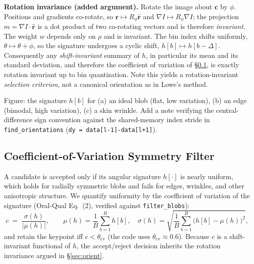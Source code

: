 \begin{enrichbox}
\textbf{Rotation invariance (added argument).} Rotate the image about
$\mathbf{c}$ by $\phi$. Positions and gradients co-rotate, so $\hat{\mathbf{r}}
\mapsto R_\phi\hat{\mathbf{r}}$ and $\nabla I\mapsto R_\phi\nabla I$; the
projection $m=\nabla I\cdot\hat{\mathbf{r}}$ is a dot product of two co-rotating
vectors and is therefore \emph{invariant}. The weight $w$ depends only on
$\rho$ and is invariant. The bin index shifts uniformly, $\theta\mapsto
\theta+\phi$, so the signature undergoes a cyclic shift, $h[b]\mapsto
h[b-\Delta]$. Consequently any \emph{shift-invariant} summary of $h$, in
particular its mean and its standard deviation, and therefore the coefficient of variation
of \S\ref{sec:cov}, is exactly rotation invariant up to bin quantization.
Note this yields a rotation-invariant \emph{selection criterion}, not a
canonical orientation as in Lowe's method.
\end{enrichbox}

\begin{fillbox}
Figure: the signature $h[b]$ for (a) an ideal blob (flat, low variation),
(b) an edge (bimodal, high variation), (c) a skin wrinkle. Add a note verifying
the central-difference sign convention against the shared-memory index stride
in \texttt{find\_orientations} (\texttt{dy = data[l-1]-data[l+1]}).
\end{fillbox}

\subsection{Coefficient-of-Variation Symmetry Filter}
\label{sec:cov}

A candidate is accepted only if its angular signature $h[\cdot]$ is nearly
uniform, which holds for radially symmetric blobs and fails for edges,
wrinkles, and other anisotropic structure. We quantify uniformity by the
coefficient of variation of the signature (Oral-Qual Eq.~(2), verified against
\texttt{filter\_blobs}):
\begin{equation}
\label{eq:cov}
c \;=\; \frac{\sigma(h)}{\lvert\mu(h)\rvert},\qquad
\mu(h)=\frac{1}{B}\sum_{b=1}^{B} h[b],\quad
\sigma(h)=\sqrt{\frac{1}{B}\sum_{b=1}^{B}\big(h[b]-\mu(h)\big)^2},
\end{equation}
and retain the keypoint iff $c<\theta_{\mathrm{cv}}$ (the code uses
$\theta_{\mathrm{cv}}\approx 0.6$).  Because $c$ is a shift-invariant functional of $h$,
the accept/reject decision inherits the rotation invariance argued in
\S\ref{sec:orient}.


